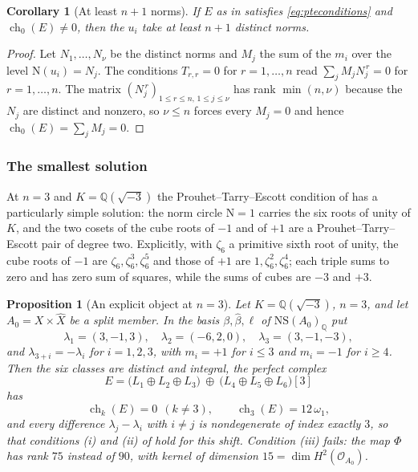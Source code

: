 \documentclass[11pt,reqno]{amsart}
\theoremstyle{plain}
\newtheorem{proposition}[theorem]{Proposition}
\newtheorem{corollary}[theorem]{Corollary}
\theoremstyle{definition}
\theoremstyle{remark}
\newcommand{\QQ}{\mathbb{Q}}
\newcommand{\cO}{\mathcal{O}}
\newcommand{\NS}{\mathrm{NS}}
\newcommand{\Nm}{\mathrm{N}}             %
\DeclareMathOperator{\ch}{ch}
\begin{document}
\begin{corollary}[At least $n+1$ norms]\label{cor:nplusone}
If $E$ as in  satisfies \eqref{eq:pteconditions} and
$\ch_{0}(E)\ne0$, then the $u_{i}$ take at least $n+1$ distinct norms.
\end{corollary}

\begin{proof}
Let $N_{1},\dots,N_{\nu}$ be the distinct norms and $M_{j}$ the sum of the
$m_{i}$ over the level $\Nm(u_{i})=N_{j}$. The conditions $T_{r,r}=0$ for
$r=1,\dots,n$ read $\sum_{j}M_{j}N_{j}^{\,r}=0$ for $r=1,\dots,n$. The matrix
$(N_{j}^{\,r})_{1\le r\le n,\,1\le j\le\nu}$ has rank $\min(n,\nu)$ because the
$N_{j}$ are distinct and nonzero, so $\nu\le n$ forces every $M_{j}=0$ and
hence $\ch_{0}(E)=\sum_{j}M_{j}=0$.
\end{proof}

\subsubsection*{The smallest solution}

At $n=3$ and $K=\QQ(\sqrt{-3})$ the Prouhet--Tarry--Escott condition of
 has a particularly simple solution: the norm circle
$\Nm=1$ carries the six roots of unity of $K$, and the two cosets of the cube
roots of $-1$ and of $+1$ are a Prouhet--Tarry--Escott pair of degree
two. Explicitly, with $\zeta_{6}$ a primitive sixth root of unity, the
cube roots of $-1$ are $\zeta_{6},\zeta_{6}^{3},\zeta_{6}^{5}$ and those of
$+1$ are $1,\zeta_{6}^{2},\zeta_{6}^{4}$; each triple sums to zero and has
zero sum of squares,
while the sums of cubes are $-3$ and $+3$.

\begin{proposition}[An explicit object at $n=3$]\label{prop:explicitobject}
Let $K=\QQ(\sqrt{-3})$, $n=3$, and let $A_{0}=X\times\widehat X$ be a split
member. In the basis $\beta,\widehat\beta,\ell$ of $\NS(A_{0})_{\QQ}$ put
\[
  \lambda_{1}=(3,-1,3),\quad
  \lambda_{2}=(-6,2,0),\quad
  \lambda_{3}=(3,-1,-3),
\]
and $\lambda_{3+i}=-\lambda_{i}$ for $i=1,2,3$, with $m_{i}=+1$ for
$i\le3$ and $m_{i}=-1$ for $i\ge4$. Then the six classes are distinct and
integral, the perfect complex
\[
  E=\bigl(L_{1}\oplus L_{2}\oplus L_{3}\bigr)\ \oplus\
    \bigl(L_{4}\oplus L_{5}\oplus L_{6}\bigr)[3]
\]
has
\[
  \ch_{k}(E)=0\ \ (k\ne3),
  \qquad
  \ch_{3}(E)=12\,\omega_{1},
\]
and every difference $\lambda_{j}-\lambda_{i}$ with $i\ne j$ is nondegenerate
of index exactly $3$, so that conditions (i) and (ii) of
 hold for this shift. Condition (iii) fails: the map
$\Phi$ has rank $75$ instead of $90$, with kernel of dimension
$15=\dim H^{2}(\cO_{A_{0}})$.
\end{proposition}
\end{document}
